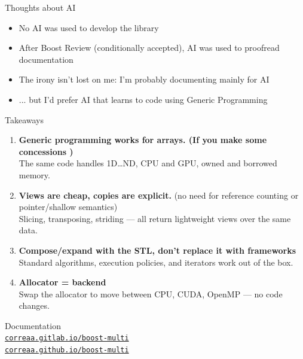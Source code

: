 \begin{frame}{Thoughts about AI}
  \begin{itemize}
    \item No AI was used to develop the library
    \item After Boost Review (conditionally accepted), AI was used to proofread documentation
    \item The irony isn't lost on me: I'm probably documenting mainly for AI
    \item ... but I'd prefer AI that learns to code using Generic Programming
  \end{itemize}
\end{frame}

\begin{frame}{Takeaways}

\begin{enumerate}
  \item \textbf{Generic programming works for arrays. (If you make some concessions )}\\
    The same code handles 1D\ldots ND, CPU and GPU, owned and borrowed memory.

  \item \textbf{Views are cheap, copies are explicit.} (no need for reference counting or pointer/shallow semantics)\\
    Slicing, transposing, striding --- all return lightweight views over the same data.

  \item \textbf{Compose/expand with the STL, don't replace it with frameworks}\\
    Standard algorithms, execution policies, and iterators work out of the box.

  \item \textbf{Allocator = backend}\\
    Swap the allocator to move between CPU, CUDA, OpenMP --- no code changes.
\end{enumerate}
\vfill
\begin{center}
  Documentation\\
  \Large\href{https://correaa.gitlab.io/boost-multi/}{\texttt{correaa.gitlab.io/boost-multi}}\\
  \Large\href{https://correaa.github.io/boost-multi/}{\texttt{correaa.github.io/boost-multi}}
\end{center}

\end{frame}
